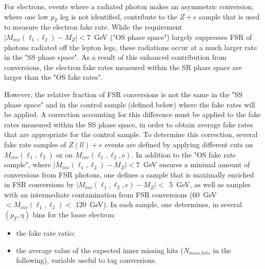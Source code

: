 For electrons, events where a radiated photon makes an asymmetric conversion, where one low $p_T$ leg is not identified, contribute to the $Z + e$ sample that is used to measure the electron fake rate. While the requirement $|M_{inv}(\ell_{1},\ell_{2}) - M_{Z}| < 7 $~GeV ("OS phase space") largely suppresses FSR of photons radiated off the lepton legs, these radiations occur at a much larger rate in the "SS phase space".
As a result of this enhanced
contribution from conversions, the electron fake rates measured
within the SR phase space  are larger than the "OS fake rates".

However, the relative fraction of FSR conversions is not the same in the "SS phase space"
and in the control sample (defined below) where the fake rates will be applied. A correction
accounting for this difference must be applied to the fake rates measured within
the SS phase space, in order to obtain
average fake rates that are appropriate for the control sample.
To determine this correction,
several fake rate samples of $Z(ll) + e$ events are defined by applying different
cuts on $M_{inv}(\ell_{1},\ell_{2})$ or on $M_{inv}(\ell_{1},\ell_{2}, e)$.
In addition to the "OS fake rate sample", where $|M_{inv}(\ell_{1},\ell_{2}) - M_{Z}| < 7 $~GeV ensures
a minimal amount of conversions from FSR photons, one defines a sample that is
maximally enriched in FSR conversions by
$ | M_{inv}(\ell_{1},\ell_{2}, e) - M_Z | < $~5~GeV,
as well as samples with
an intermediate contamination from FSR conversions (60~GeV $< M_{inv}(\ell_{1},\ell_{2}) < $ 120~GeV).
In each sample, one determines, in several $(p_T, \eta)$ bins for the loose electron:
\begin{itemize}
 \item the fake rate ratio;
 \item the average value of the expected inner missing hits ($N_{miss. hits}$ in the following), variable useful to tag conversions.
\end{itemize}
%


